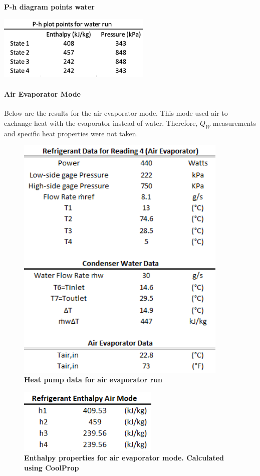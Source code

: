 \documentclass{article}
\begin{document}
\begin{table} [H]
	\centering
	\caption{\textbf{P-h diagram points water}}
	\includegraphics[width=0.55\textwidth]{ph_points_water}
\end{table}

\newpage
\paragraph{Air Evaporator Mode}
Below are the results for the air evaporator mode. This mode used air to exchange heat with the evaporator instead of water. Therefore, $Q_W$ measurements  and specific heat properties were not taken. 
\begin{figure} [H]
	\centering
	\includegraphics[width=0.9\textwidth]{A_run}
	\caption{\textbf{Heat pump data for air evaporator run}}
\end{figure}


\begin{figure} [H]
	\centering
	\includegraphics[width=0.6\textwidth]{air_enthalpy}
	\caption{\textbf{Enthalpy properties for air evaporator mode. Calculated using CoolProp}}
\end{figure}
\end{document}
